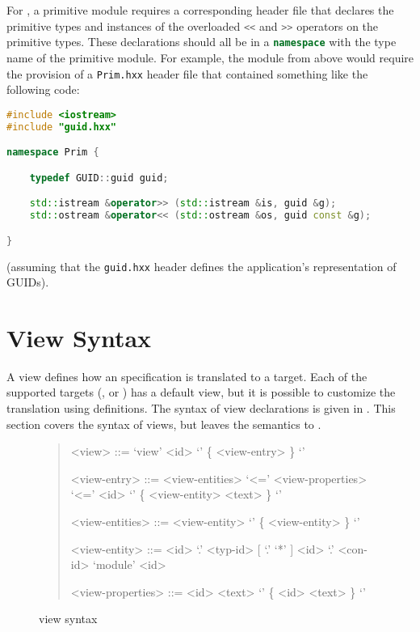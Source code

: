 For \Cplusplus{}, a primitive module requires a corresponding header file that declares
the primitive types and instances of the overloaded \lstinline[language=c++]!<<! and
\lstinline[language=c++]!>>! operators on the primitive types.  These declarations should
all be in a \lstinline[language=c++]!namespace! with the type name of the primitive module.
For example, the module from above would require the provision of a \texttt{Prim.hxx} header
file that contained something like the following code:
%
\begin{code}\begin{lstlisting}[language=c++]
#include <iostream>
#include "guid.hxx"

namespace Prim {

    typedef GUID::guid guid;

    std::istream &operator>> (std::istream &is, guid &g);
    std::ostream &operator<< (std::ostream &os, guid const &g);

}
\end{lstlisting}\end{code}%
(assuming that the \texttt{guid.hxx} header defines the application's representation
of GUIDs).


\section{View Syntax}
\label{sec:view-syntax}

A view defines how an \asdl{} specification is translated to a target.
Each of the supported targets (\eg{}, \sml{} or \Cplusplus{}) has a default
view, but it is possible to customize the translation using 
definitions.
The syntax of view declarations is given in .
This section covers the syntax of views, but leaves the semantics to
.

\begin{figure}[t]
  \begin{quote}
    \begin{grammar}
      <view>        ::= `view' <id> `{' \{ <view-entry> \} `}'

      <view-entry>  ::=  <view-entities> `<=' <view-properties>
         \alt{} `<=' <id> `{' \{ <view-entity> <text> \} `}'

      <view-entities> ::= <view-entity>
         \alt{} `{' \{ <view-entity> \} `}'

      <view-entity> ::= <id> `.' <typ-id> [ `.' `*' ]
         \alt{} <id> `.' <con-id>
         \alt{} `module' <id>

      <view-properties> ::= <id> <text>
          \alt{} `{' \{ <id> <text> \} `}'
    \end{grammar}%
  \end{quote}%
  \caption{\asdl{} view syntax}
  \label{fig:view-syntax}
\end{figure}%

